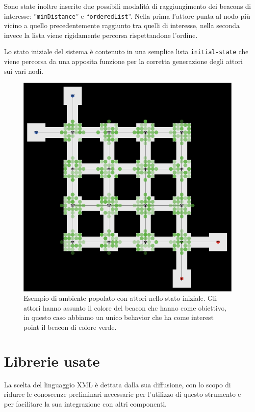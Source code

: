 Sono state inoltre inserite due possibili modalità di raggiungimento dei beacons di interesse: ”\texttt{minDistance}” e “\texttt{orderedList}”. Nella prima l'attore punta al nodo più vicino a quello precedentemente raggiunto tra quelli di interesse, nella seconda invece la lista viene rigidamente percorsa rispettandone l'ordine.

Lo stato iniziale del sistema è contenuto in una semplice lista \texttt{initial-state} che viene percorsa da una apposita funzione per la corretta generazione degli attori sui vari nodi.
 
\begin{figure}[htbp]
\centering
\includegraphics[width=\textwidth,height=\textheight,keepaspectratio]{images/movers-screen.png}
\caption{Esempio di ambiente popolato con attori nello stato iniziale. Gli attori hanno assunto il colore del beacon che hanno come obiettivo, in questo caso abbiamo un unico behavior che ha come interest point il beacon di colore verde.}
\label{fig:movers-screen}
\end{figure}

\section{Librerie usate}
\label{sec:librerie}
La scelta del linguaggio XML è dettata dalla sua diffusione, con lo scopo di ridurre le conoscenze preliminari necessarie per l'utilizzo di questo strumento e per facilitare la sua integrazione con altri componenti.

